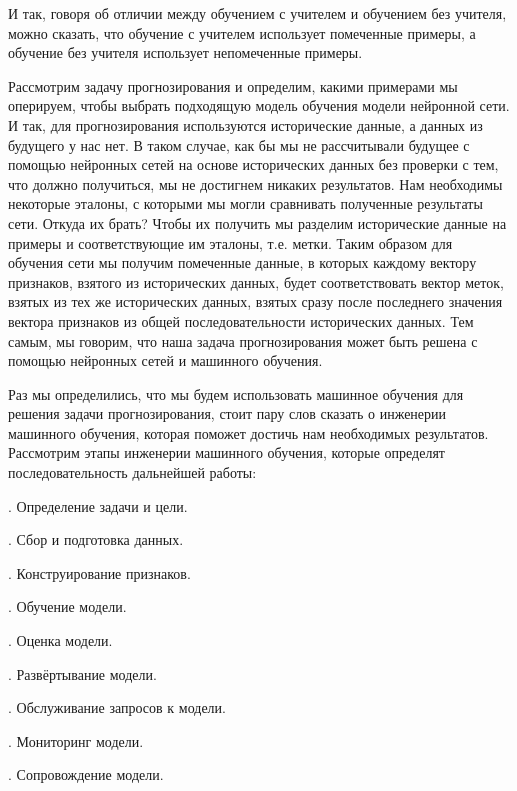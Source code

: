 {  \par \redline И так, говоря об отличии между обучением с учителем и обучением без учителя, можно сказать, что обучение с учителем использует помеченные примеры, а обучение без учителя использует непомеченные примеры. 

  \par \redline	Рассмотрим задачу прогнозирования и определим, какими примерами мы оперируем, чтобы выбрать подходящую модель обучения модели нейронной сети. И так, для прогнозирования используются исторические данные, а данных из будущего у нас нет. В таком случае, как бы мы не рассчитывали будущее с помощью нейронных сетей на основе исторических данных без проверки с тем, что должно получиться, мы не достигнем никаких результатов. Нам необходимы некоторые эталоны, с которыми мы могли сравнивать полученные результаты сети. Откуда их брать? Чтобы их получить мы разделим исторические данные на примеры и соответствующие им эталоны, т.е. метки. Таким образом для обучения сети мы получим помеченные данные, в которых каждому вектору признаков, взятого из исторических данных, будет соответствовать вектор меток, взятых из тех же исторических данных, взятых сразу после последнего значения вектора признаков из общей последовательности исторических данных. Тем самым, мы говорим, что наша задача прогнозирования может быть решена с помощью нейронных сетей и машинного обучения.

  \par \redline Раз мы определились, что мы будем использовать машинное обучения для решения задачи прогнозирования, стоит пару слов сказать о инженерии машинного обучения, которая поможет достичь нам необходимых результатов. Рассмотрим этапы инженерии машинного обучения, которые определят последовательность дальнейшей работы:

  \par {}. Определение задачи и цели. 
  \par {}. Сбор и подготовка данных. 
  \par {}. Конструирование признаков.
  \par {}. Обучение модели.
  \par {}. Оценка модели.
  \par {}. Развёртывание модели.
  \par {}. Обслуживание запросов к модели.
  \par {}. Мониторинг модели.
  \par {}. Сопровождение модели. 

}
